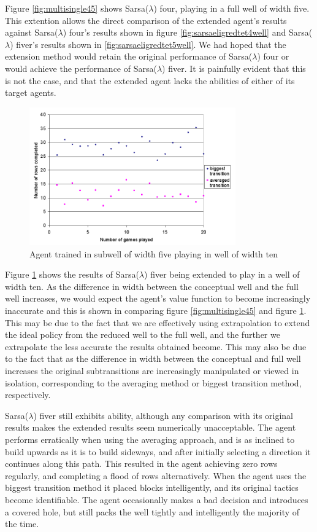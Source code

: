 \documentclass{rucsthesis}
\begin{document}
Figure \ref{fig:multisingle45} shows Sarsa($\lambda$) four, playing in a full well of width five. This extention allows the direct comparison of the extended agent's results against Sarsa($\lambda$) four's results shown in figure \ref{fig:sarsaeligredtet4well} and Sarsa($\lambda$) fiver's results shown in \ref{fig:sarsaeligredtet5well}. We had hoped that the extension method would retain the original performance of Sarsa($\lambda$) four or would achieve the performance of Sarsa($\lambda$) fiver.  It is painfully evident that this is not the case, and that the extended agent lacks the abilities of either of its target agents.

\begin{figure}[h]
\centering
\includegraphics[width=3.5in]{multisingle.png}
\caption{Agent trained in subwell of width five playing in well of width ten}
\label{fig:multisingle}
\end{figure}

Figure \ref{fig:multisingle} shows the results of Sarsa($\lambda$) fiver being extended to play in a well of width ten. As the difference in width between the conceptual well and the full well increases, we would expect the agent's value function to become increasingly inaccurate and this is shown in comparing figure \ref{fig:multisingle45} and figure \ref{fig:multisingle}. This may be due to the fact that we are effectively using extrapolation to extend the ideal policy from the reduced well to the full well, and the further we extrapolate the less accurate the results obtained become. This may also be due to the fact that as the difference in width between the conceptual and full well increases the original subtransitions are increasingly manipulated or viewed in isolation, corresponding to the averaging method or biggest transition method, respectively.

Sarsa($\lambda$) fiver still exhibits ability, although any comparison with its original results makes the extended results seem numerically unacceptable.  The agent performs erratically when using the averaging approach, and is as inclined to build upwards as it is to build sideways, and after initially selecting a direction it continues  along this path. This resulted in the agent achieving zero rows regularly, and completing a flood of rows alternatively. When the agent uses the biggest transition method it placed blocks intelligently, and its original tactics become identifiable. The agent occasionally makes a bad decision and introduces a covered hole, but still packs the well tightly and intelligently the majority of the time.
\end{document}
